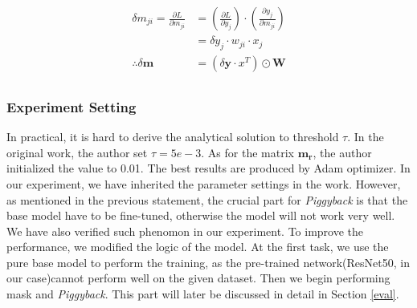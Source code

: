 \begin{equation}
\begin{aligned}
\delta m_{ji}=\frac{\partial L}{\partial m_{ji}} &= (\frac{\partial L}{\partial y_j})\cdot (\frac{\partial y_j}{\partial m_{ji}}) \\
&= \delta y_j \cdot w_{ji} \cdot x_j \\
\therefore \delta \mathbf{m} &= (\delta \mathbf{y} \cdot x^T) \odot \mathbf{W} \\
\end{aligned}
\end{equation}
\subsubsection{Experiment Setting}
In practical, it is hard to derive the analytical solution to threshold $\tau$. In the original work, the author set $\tau=5e-3$. As for the matrix $\mathbf{m_r}$, the author initialized the value to 0.01. The best results are produced by Adam optimizer. In our experiment, we have inherited the parameter settings in the work. However, as mentioned in the previous statement, the crucial part for \textit{Piggyback} is that the base model have to be fine-tuned, otherwise the model will not work very well. We have also verified such phenomon in our experiment. To improve the performance, we modified the logic of the model. At the first task, we use the pure base model to perform the training, as the pre-trained network(ResNet50\cite{he2016deep}, in our case)cannot perform well on the given dataset. Then we begin performing mask and \textit{Piggyback}. This part will later be discussed in detail in Section \ref{eval}.





